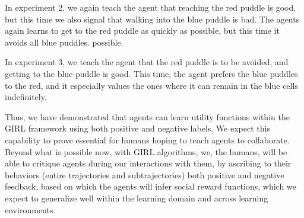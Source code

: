 In experiment 2, we again teach the agent that reaching the red puddle
is good, but this time we also signal that walking into the blue
puddle is bad.  The agents again learns to get to the red puddle as
quickly as possible, but this time it avoids all blue puddles.
possible.

In experiment 3, we teach the agent that the red puddle is to be
avoided, and getting to the blue puddle is good.  This time, the agent
prefers the blue puddles to the red, and it especially values the ones
where it can remain in the blue cells indefinitely.


Thus, we have demonstrated that agents can learn utility functions
within the GIRL framework using both positive and negative labels.  We
expect this capability to prove essential for humans hoping to teach
agents to collaborate.  Beyond what is possible now, with GIRL
algorithms, we, the humans, will be able to critique agents during our
interactions with them, by ascribing to their behaviors (entire
trajectories and subtrajectories) both positive and negative feedback,
based on which the agents will infer social reward functions, which we
expect to generalize well within the learning domain and across
learning environments.

